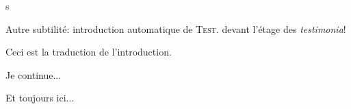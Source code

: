 \documentclass[article,12pt]{memoir}
\begin{document}
\tableofcontents
\begin{pages}
\begin{Rightside}
\beginnumbering
\pstart
{}


s
\pend

\pstart
{}
\pend

\pstart
Autre subtilité: introduction automatique de \textsc{Test.} devant l'étage des \emph{testimonia}!
\pend

\endnumbering
\end{Rightside}

\begin{Leftside}
\beginnumbering
\pstart
{}
Ceci est la traduction de l'introduction.
\pend

\pstart
{}
Je continue...
\pend

\pstart
Et toujours ici...
\pend

\endnumbering

\end{Leftside}

\Pages

\end{pages}
\end{document}
